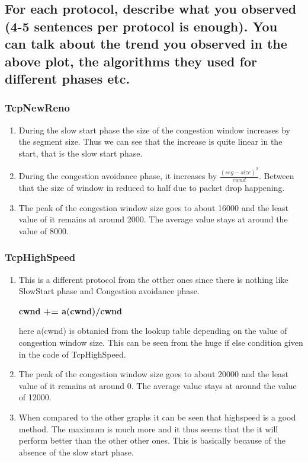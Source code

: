 \documentclass{article}
\begin{document}
\subsection{For each protocol, describe what you observed (4-5 sentences per protocol is
enough). You can talk about the trend you observed in the above plot, the algorithms
they used for different phases etc.}

\subsubsection{TcpNewReno}
\begin{enumerate}
    \item During the slow start phase the size of the congestion window increases by the segment size. Thus we can see that the increase is quite linear in the start, that is the slow start phase.
    \item During the congestion avoidance phase, it increases by $\frac{(seg-size)^2}{cwnd}$. Between that the size of window in reduced to half due to packet drop happening.
    \item The peak of the congestion window size goes to about 16000 and the least value of it remains at around 2000. The average value stays at around the value of 8000.
\end{enumerate}
\subsubsection{TcpHighSpeed}
\begin{enumerate}
    \item This is a different protocol from the otther ones since there is nothing like SlowStart phase and Congestion avoidance phase. 
    \begin{center}
        \textbf{cwnd += a(cwnd)/cwnd}
    \end{center}
    here a(cwnd) is obtanied from the lookup table depending on the value of congestion window size. This can be seen from the huge if else condition given in the code of TcpHighSpeed.
    \item The peak of the congestion window size goes to about 20000 and the least value of it remains at around 0. The average value stays at around the value of 12000.
    \item When compared to the other graphs it can be seen that highspeed is a good method. The maximum is much more and it thus seems that the it will perform better than the other other ones. This is basically because of the absence of the slow start phase.
\end{enumerate}
\end{document}
